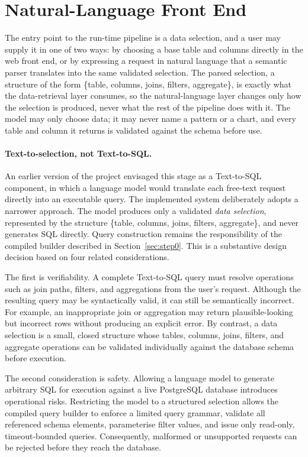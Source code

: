 \section{Natural-Language Front End}
\label{sec:nl-front-end}

The entry point to the run-time pipeline is a data selection, and a user may supply it in one of two ways: by choosing a base table and columns directly in the web front end, or by expressing a request in natural language that a semantic parser translates into the same validated selection. The parsed selection, a structure of the form \{table, columns, joins, filters, aggregate\}, is exactly what the data-retrieval layer consumes, so the natural-language layer changes only how the selection is produced, never what the rest of the pipeline does with it. The model may only choose data; it may never name a pattern or a chart, and every table and column it returns is validated against the schema before use.

\paragraph{Text-to-selection, not Text-to-SQL.}
An earlier version of the project envisaged this stage as a Text-to-SQL component, in which a language model would translate each free-text request directly into an executable query. The implemented system deliberately adopts a narrower approach. The model produces only a validated \emph{data selection}, represented by the structure \{table, columns, joins, filters, aggregate\}, and never generates SQL directly. Query construction remains the responsibility of the compiled builder described in Section~\ref{sec:step0}. This is a substantive design decision based on four related considerations.

The first is verifiability. A complete Text-to-SQL query must resolve operations such as join paths, filters, and aggregations from the user’s request. Although the resulting query may be syntactically valid, it can still be semantically incorrect. For example, an inappropriate join or aggregation may return plausible-looking but incorrect rows without producing an explicit error. By contrast, a data selection is a small, closed structure whose tables, columns, joins, filters, and aggregate operations can be validated individually against the database schema before execution.

The second consideration is safety. Allowing a language model to generate arbitrary SQL for execution against a live PostgreSQL database introduces operational risks. Restricting the model to a structured selection allows the compiled query builder to enforce a limited query grammar, validate all referenced schema elements, parameterise filter values, and issue only read-only, timeout-bounded queries. Consequently, malformed or unsupported requests can be rejected before they reach the database.

